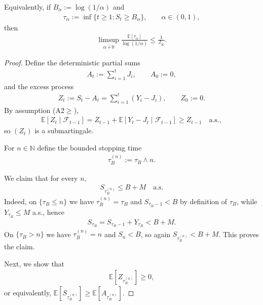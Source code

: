 \begin{theorem}
Equivalently, if $B_\alpha := \log(1/\alpha)$ and
\begin{align*}
\tau_\alpha := \inf\{ t \geq 1 : S_t \geq B_\alpha \},
\qquad \alpha \in (0,1),
\end{align*}
then
\begin{align*}
\limsup_{\alpha \downarrow 0}
\frac{\mathbb{E}[\tau_\alpha]}{\log(1/\alpha)}
\leq \frac{1}{J_\infty} .
\end{align*}
\end{theorem}


\begin{proof}

Define the deterministic partial sums
\begin{align*}
A_t := \sum_{i=1}^t J_i, \qquad A_0 := 0,
\end{align*}
and the excess process
\begin{align*}
Z_t := S_t - A_t = \sum_{i=1}^t (Y_i - J_i), \qquad Z_0 := 0.
\end{align*}
By assumption (A2$\ge$),
\begin{align*}
\mathbb{E}[Z_t \mid \mathcal{F}_{t-1}]
= Z_{t-1} + \mathbb{E}[Y_t - J_t \mid \mathcal{F}_{t-1}]
\geq Z_{t-1}
\quad \text{a.s.},
\end{align*}
so $(Z_t)$ is a submartingale.

For $n \in \mathbb{N}$ define the bounded stopping time
\begin{align*}
\tau_B^{(n)} := \tau_B \wedge n .
\end{align*}

We claim that for every $n$,
\begin{align*}
S_{\tau_B^{(n)}} \leq B + M \quad \text{a.s.}
\end{align*}
Indeed, on $\{\tau_B \leq n\}$ we have $\tau_B^{(n)} = \tau_B$ and
$S_{\tau_B - 1} < B$ by definition of $\tau_B$, while $Y_{\tau_B} \leq M$ a.s.,
hence
\begin{align*}
S_{\tau_B} = S_{\tau_B - 1} + Y_{\tau_B} < B + M .
\end{align*}
On $\{\tau_B > n\}$ we have $\tau_B^{(n)} = n$ and $S_n < B$, so again
$S_{\tau_B^{(n)}} < B + M$.
This proves the claim.

Next, we show that
\begin{align*}
\mathbb{E}[Z_{\tau_B^{(n)}}] \geq 0,
\end{align*}
or equivalently,
$\mathbb{E}[S_{\tau_B^{(n)}}] \geq \mathbb{E}[A_{\tau_B^{(n)}}].$


\end{proof}
